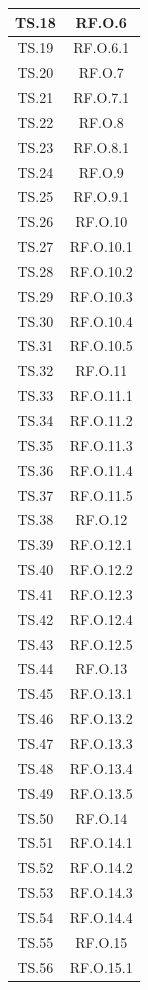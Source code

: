 \documentclass[10pt, a4paper]{article}
\begin{document}
\begin{xltabular}{\textwidth}{|c|c|}
\hline
TS.18 & RF.O.6 \\
\hline
TS.19 & RF.O.6.1 \\
\hline
TS.20 & RF.O.7 \\
\hline
TS.21 & RF.O.7.1 \\
\hline
TS.22 & RF.O.8 \\
\hline
TS.23 & RF.O.8.1 \\
\hline
TS.24 & RF.O.9 \\
\hline
TS.25 & RF.O.9.1 \\
\hline
TS.26 & RF.O.10 \\
\hline
TS.27 & RF.O.10.1 \\
\hline
TS.28 & RF.O.10.2 \\
\hline
TS.29 & RF.O.10.3 \\
\hline
TS.30 & RF.O.10.4 \\
\hline
TS.31 & RF.O.10.5 \\
\hline
TS.32 & RF.O.11 \\
\hline
TS.33 & RF.O.11.1 \\
\hline
TS.34 & RF.O.11.2 \\
\hline
TS.35 & RF.O.11.3 \\
\hline
TS.36 & RF.O.11.4 \\
\hline
TS.37 & RF.O.11.5 \\
\hline
TS.38 & RF.O.12 \\
\hline
TS.39 & RF.O.12.1 \\
\hline
TS.40 & RF.O.12.2 \\
\hline
TS.41 & RF.O.12.3 \\
\hline
TS.42 & RF.O.12.4 \\
\hline
TS.43 & RF.O.12.5 \\
\hline
TS.44 & RF.O.13 \\
\hline
TS.45 & RF.O.13.1 \\
\hline
TS.46 & RF.O.13.2 \\
\hline
TS.47 & RF.O.13.3 \\
\hline
TS.48 & RF.O.13.4 \\
\hline
TS.49 & RF.O.13.5 \\
\hline
TS.50 & RF.O.14 \\
\hline
TS.51 & RF.O.14.1 \\
\hline
TS.52 & RF.O.14.2 \\
\hline
TS.53 & RF.O.14.3 \\
\hline
TS.54 & RF.O.14.4 \\
\hline
TS.55 & RF.O.15 \\
\hline
TS.56 & RF.O.15.1 \\

\end{xltabular}
\end{document}
